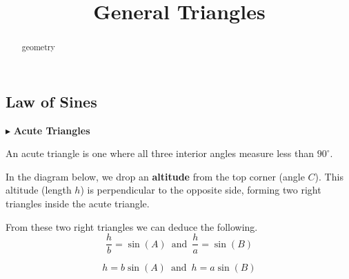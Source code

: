 \documentclass{ximera}
\title{General Triangles}
\begin{document}
\begin{abstract}
geometry
\end{abstract}
\maketitle






\subsection*{Law of Sines}




$\blacktriangleright$  \textbf{\textcolor{blue!55!black}{Acute Triangles}}  

An acute triangle is one where all three interior angles measure less than $90^{\circ}$. 

In the diagram below, we drop an \textbf{altitude} from the top corner (angle $C$). This altitude (length $h$) is perpendicular to the opposite side, forming two right triangles inside the acute triangle.


\begin{image}[3in]
  \end{image}

From these two right triangles we can deduce the following. \\

\[    \frac{h}{b} = \sin(A)   \, \text{ and } \,    \frac{h}{a} = \sin(B)       \]



\[    h = b \sin(A)      \, \text{ and } \,    h = a \sin(B)    \]
\end{document}
